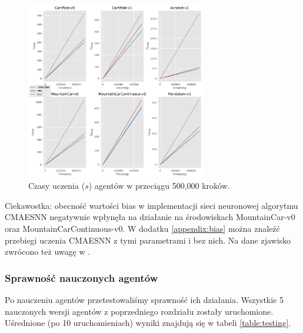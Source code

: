 \documentclass[12pt,a4paper]{article}
\begin{document}
\begin{figure}[!h]
  \centering
  \includegraphics[width=0.7\textwidth]{../plotting/plots/plot_time0.pdf}
  \caption{Czasy uczenia ($s$) agentów w przeciągu 500,000 kroków.}
  \label{fig:training_time}
\end{figure}

Ciekawostka: obecność wartości bias w implementacji sieci neuronowej
algorytmu CMAESNN negatywnie wpłynęła na działanie na środowiskach
MountainCar-v0 oraz MountainCarContinuous-v0. W dodatku \ref{appendix:bias}
można znaleźć przebiegi uczenia CMAESNN z tymi parametrami i bez nich.
Na dane zjawisko zwrócono też uwagę w \cite{analyzing_reinforcement}.

\subsubsection{Sprawność nauczonych agentów}

Po nauczeniu agentów przetestowaliśmy sprawność ich działania.
Wszystkie 5 nauczonych wersji agentów z poprzedniego rozdziału zostały
uruchomione. Uśrednione (po 10 uruchomieniach) wyniki znajdują się w tabeli
\ref{table:testing}.
\end{document}
